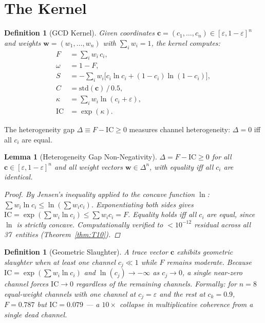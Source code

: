 \documentclass[
  aps,
  prd,
  twocolumn,
  superscriptaddress,
  nofootinbib,
  floatfix
]{revtex4-2}
\newtheorem{definition}[theorem]{Definition}
\newtheorem{lemma}[theorem]{Lemma}
\newcommand{\eps}{\varepsilon}
\newcommand{\tvec}{\mathbf{c}}
\newcommand{\wvec}{\mathbf{w}}
\newcommand{\IC}{\mathrm{IC}}
\begin{document}
\section{The Kernel}\label{sec:kernel}

\begin{definition}[GCD Kernel]\label{def:kernel}
Given coordinates $\tvec = (c_1, \ldots, c_n) \in
[\eps, 1{-}\eps]^n$ and weights $\wvec = (w_1, \ldots, w_n)$
with $\sum_i w_i = 1$, the kernel computes:
\begin{align}
  F &= \textstyle\sum_i w_i \, c_i, \label{eq:F} \\
  \omega &= 1 - F, \label{eq:omega} \\
  S &= -\textstyle\sum_i w_i \bigl[c_i \ln c_i
    + (1{-}c_i)\ln(1{-}c_i)\bigr], \label{eq:S} \\
  C &= \mathrm{std}(\tvec)\,/\,0.5, \label{eq:C} \\
  \kappa &= \textstyle\sum_i w_i \ln(c_i + \eps), \label{eq:kappa} \\
  \IC &= \exp(\kappa). \label{eq:IC}
\end{align}
\end{definition}

The heterogeneity gap $\Delta \equiv F - \IC \geq 0$ measures
channel heterogeneity: $\Delta = 0$ iff all $c_i$ are equal.

\begin{lemma}[Heterogeneity Gap Non-Negativity]\label{lem:gap}
$\Delta = F - \IC \geq 0$ for all $\tvec \in [\eps, 1{-}\eps]^n$
and all weight vectors $\wvec \in \Delta^n$, with equality iff
all $c_i$ are identical.
\begin{proof}
By Jensen's inequality applied to the concave function
$\ln$: $\sum w_i \ln c_i \leq \ln(\sum w_i c_i)$.
Exponentiating both sides gives
$\IC = \exp(\sum w_i \ln c_i) \leq \sum w_i c_i = F$.
Equality holds iff all $c_i$ are equal, since $\ln$ is
strictly concave.  Computationally verified to $< 10^{-12}$
residual across all 37~entities (Theorem~\ref{thm:T10}).
\end{proof}
\end{lemma}

\begin{definition}[Geometric Slaughter]\label{def:slaughter}
A trace vector $\tvec$ exhibits \emph{geometric slaughter}
when at least one channel $c_j \ll 1$ while $F$ remains
moderate.  Because $\IC = \exp(\sum w_i \ln c_i)$ and
$\ln(c_j) \to -\infty$ as $c_j \to 0$, a single
near-zero channel forces $\IC \to 0$ regardless of the
remaining channels.  Formally: for $n = 8$ equal-weight
channels with one channel at $c_j = \eps$ and the rest at
$c_k = 0.9$, $F = 0.787$ but $\IC = 0.079$ ---
a $10\times$ collapse in multiplicative coherence from a
single dead channel.
\end{definition}
\end{document}
